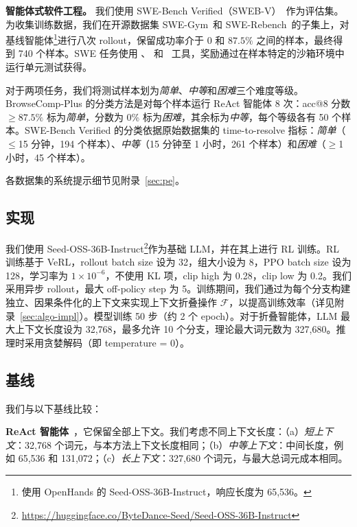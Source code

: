 \noindent \textbf{智能体式软件工程。}
我们使用 SWE-Bench Verified（SWEB-V）~\citep{Jimenez2023SWEbenchCL}作为评估集。为收集训练数据，我们在开源数据集 SWE-Gym~\citep{Pan2024TrainingSE}和 SWE-Rebench~\citep{Badertdinov2025SWErebenchAA}的子集上，对基线智能体\footnote{使用 OpenHands 的 Seed-OSS-36B-Instruct，响应长度为 65,536。}进行八次 rollout，保留成功率介于 0 和 $87.5\%$ 之间的样本，最终得到 740 个样本。SWE 任务使用 、 和 ~\citep{Wang2024OpenHandsAO}工具，奖励通过在样本特定的沙箱环境中运行单元测试获得。

对于两项任务，我们将测试样本划为\textit{简单}、\textit{中等}和\textit{困难}三个难度等级。BrowseComp-Plus 的分类方法是对每个样本运行 ReAct 智能体 8 次：acc@8 分数 $\geq87.5\%$ 标为\textit{简单}，分数为 0\% 标为\textit{困难}，其余标为\textit{中等}，每个等级各有 50 个样本。SWE-Bench Verified 的分类依据原始数据集的 time-to-resolve 指标：\textit{简单}（$\le$15 分钟，194 个样本）、\textit{中等}（15 分钟至 1 小时，261 个样本）和\textit{困难}（$\ge$1 小时，45 个样本）。

各数据集的系统提示细节见附录~\ref{sec:pe}。

\subsection{实现}
我们使用 Seed-OSS-36B-Instruct\footnote{\url{https://huggingface.co/ByteDance-Seed/Seed-OSS-36B-Instruct}}作为基础 LLM，并在其上进行 RL 训练。RL 训练基于 VeRL，rollout batch size 设为 32，组大小设为 8，PPO batch size 设为 128，学习率为 $1\times10^{-6}$，不使用 KL 项，clip high 为 0.28，clip low 为 0.2。我们采用异步 rollout，最大 off-policy step 为 5。训练期间，我们通过为每个分支构建独立、因果条件化的上下文来实现上下文折叠操作 $\mathcal{F}$，以提高训练效率（详见附录~\ref{sec:algo-impl}）。模型训练 50 步（约 2 个 epoch）。对于折叠智能体，LLM 最大上下文长度设为 32,768，最多允许 10 个分支，理论最大词元数为 327,680。推理时采用贪婪解码（即 temperature = 0）。



\subsection{基线}
我们与以下基线比较：

\noindent \textbf{ReAct 智能体}~\citep{Yao2022ReActSR}，它保留全部上下文。我们考虑不同上下文长度：（a）\textit{短上下文}：32,768 个词元，与本方法上下文长度相同；（b）\textit{中等上下文}：中间长度，例如 65,536 和 131,072；（c）\textit{长上下文}：327,680 个词元，与最大总词元成本相同。

